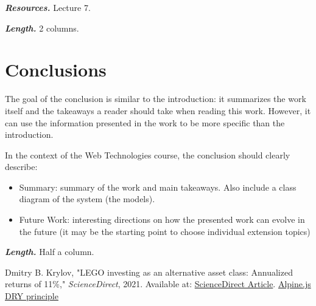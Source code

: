 \documentclass[letterpaper,twocolumn]{article}
\newcommand{\myparagraph}[1]{\vspace{0.1cm}\noindent \textbf{\textit{#1.}}}
\begin{document}
\myparagraph{Resources} Lecture 7.

\myparagraph{Length} 2 columns.

\section{Conclusions}

The goal of the conclusion is similar to the introduction: it summarizes the work itself and the takeaways a reader should take when reading this work. However, it can use the information presented in the work to be more specific than the introduction.

In the context of the Web Technologies course, the conclusion should clearly describe:

\begin{itemize}
    \item Summary: summary of the work and main takeaways. Also include a class diagram of the system (the models).
    \item Future Work: interesting directions on how the presented work can evolve in the future (it may be the starting point to choose individual extension topics)
\end{itemize}

\myparagraph{Length} Half a column.

\begin{thebibliography}{9}
    
    Dmitry B. Krylov, "LEGO investing as an alternative asset class: Annualized returns of 11\%," 
    \textit{ScienceDirect}, 2021. Available at: \href{https://www.sciencedirect.com/science/article/abs/pii/S0275531921001604?via%3Dihub}{ScienceDirect Article}.
     \href{https://alpinejs.dev}{Alpine.js}
     \href{https://en.wikipedia.org/wiki/Don%27t_repeat_yourself}{DRY principle}
    
\end{thebibliography}
\end{document}

